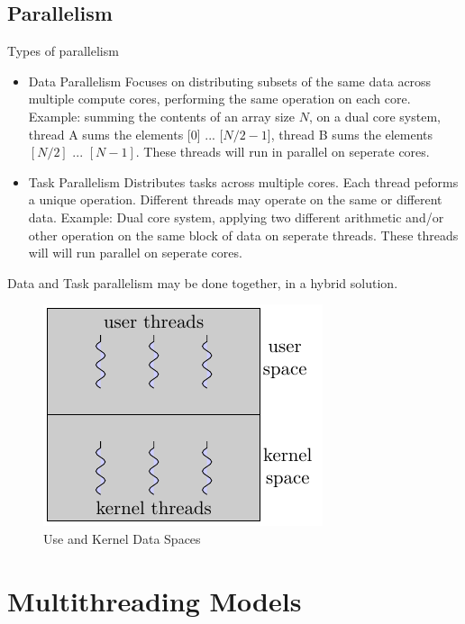 \documentclass[oneside]{book}
\begin{document}
            \subsection{Parallelism}
                Types of parallelism
                \begin{itemize}
                    \item Data Parallelism
                        \subitem Focuses on distributing subsets of the same data across multiple compute cores, performing the same operation on each core.
                        \subitem Example: summing the contents of an array size $N$, on a dual core system, thread A sums the elements [0] ... [$N/2 - 1$], thread B
                        sums the elements $[N/2]$ ... $[N-1]$. These threads will run in parallel on seperate cores.
                    \item Task Parallelism
                        \subitem Distributes tasks across multiple cores. Each thread peforms a unique operation. Different threads may operate on the same or different
                        data.
                        \subitem Example: Dual core system, applying two different arithmetic and/or other operation on the same block of data on seperate threads. These
                        threads will will run parallel on seperate cores.
                \end{itemize}
                Data and Task parallelism may be done together, in a hybrid solution.
                \begin{figure}[H]
                    \centering
                    \includegraphics{figures/data_spaces.pdf}
                    \caption{Use and Kernel Data Spaces}
                \end{figure}
        \section{Multithreading Models}
\end{document}
